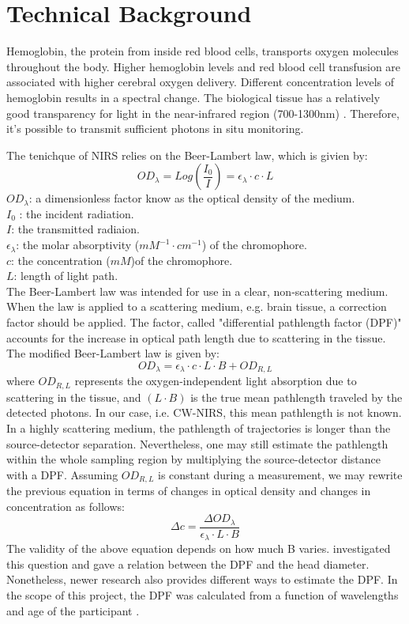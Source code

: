 \section{Technical Background}
Hemoglobin, the protein from inside red blood cells, transports oxygen molecules throughout the body. Higher hemoglobin levels and red blood cell transfusion are associated with higher cerebral oxygen delivery. Different concentration levels of hemoglobin results in a spectral change. The biological tissue has a relatively good transparency for light in the near-infrared region (700-1300nm) \cite{doi:10.1126/science.929199}. Therefore, it's possible to transmit sufficient photons in situ monitoring. 

The tenichque of NIRS relies on the Beer-Lambert law, which is givien by:
\[
OD_{\lambda} = Log(\frac {I_0}{I}) = \epsilon _{\lambda} \cdot c \cdot L
\]
$OD_{\lambda} $: a dimensionless factor know as the optical density of the medium.  \\
$I_0$ : the incident radiation. \\
$I$: the transmitted radiaion. \\
$\epsilon _{\lambda}$: the molar absorptivity ($mM^{-1} \cdot cm^{-1}$) of the chromophore. \\
$c$: the concentration ($mM$)of the chromophore. \\
$L$: length of light path. \\

The Beer-Lambert law was intended for use in a clear, non-scattering medium. When the law is applied to a scattering medium, e.g. brain tissue, a correction factor should be applied. The factor, called "differential pathlength factor (DPF)" accounts for the increase in optical path length due to scattering in the tissue. The modified Beer-Lambert law is given by:
\[
OD_{\lambda} = \epsilon _{\lambda} \cdot c \cdot L \cdot B + OD_{R,L}
\]
where $OD_{R,L}$ represents the oxygen-independent light absorption due to scattering in the tissue, and $(L \cdot B)$ is the true mean pathlength traveled by the detected photons. In our case, i.e. CW-NIRS, this mean pathlength is not known. In a highly scattering medium, the pathlength of trajectories is longer than the source-detector separation. Nevertheless, one may still estimate the pathlength within the whole sampling region by multiplying the source-detector distance with a DPF. Assuming $OD_{R,L}$ is constant during a measurement, we may rewrite the previous equation in terms of changes in optical density and changes in concentration as follows:
\[
\Delta c =\frac { \Delta OD_{\lambda}} {\epsilon _{\lambda} \cdot L \cdot B}
\]
The validity of the above equation depends on how much B varies. \cite {Delpy_1988} investigated this question and gave a relation between the DPF and the head diameter. Nonetheless, newer research also provides different ways to estimate the DPF. In the scope of this project, the DPF was calculated from a function of wavelengths and age of the participant \cite {Duncan1996MeasurementOC}.



